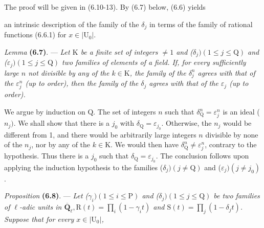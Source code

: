 \documentclass[10pt,leqno]{article}
\begin{document}
\par

\noindent The proof will be given in (6.10-13). By (6.7) below, (6.6) yields\par

\clearpage

\label{physical-26}\setcounter{page}{297}

\noindent an intrinsic description of the family of the \(\delta _{j}\) in terms of the family of rational functions (6.6.1) for \(x\in |\mathrm{U}_{0}|\).\par

\noindent \emph{Lemma} \textbf{(6.7)}. — {\itshape Let \(\mathrm{K}\) be a finite set of integers \(\ne 1\) and (\(\delta _{j}) (1\leq j\leq \mathrm{Q})\) and (\(\varepsilon _{j}) (1\leq j\leq \mathrm{Q})\) two families of elements of a field. If, for every sufficiently large \(n\) not divisible by any of the \(k\in \mathrm{K}\), the family of the \(\delta _{j}^{n}\) agrees with that of the \(\varepsilon _{j}^{n}\) (up to order), then the family of the \(\delta _{j}\) agrees with that of the \(\varepsilon _{j}\) (up to order).}\par

\noindent We argue by induction on \(\mathrm{Q}\). The set of integers \(n\) such that \(\delta _{\mathrm{Q}}^{n}=\varepsilon _{j}^{n}\) is an ideal (\(n_{j})\). We shall show that there is a \(j_{0}\) with \(\delta _{\mathrm{Q}}=\varepsilon _{j_{0}}\). Otherwise, the \(n_{j}\) would be different from 1, and there would be arbitrarily large integers \(n\) divisible by none of the \(n_{j}\), nor by any of the \(k\in \mathrm{K}\). We would then have \(\delta _{\mathrm{Q}}^{n}\ne \varepsilon _{j}^{n}\), contrary to the hypothesis. Thus there is a \(j_{0}\) such that \(\delta _{\mathrm{Q}}=\varepsilon _{j_{0}}\). The conclusion follows upon applying the induction hypothesis to the families (\(\delta _{j}) (j\ne \mathrm{Q})\) and (\(\varepsilon _{j}) (j\ne j_{0})\).\par

\noindent \emph{Proposition} \textbf{(6.8)}. — {\itshape Let (\(\gamma _{i}) (1\leq i\leq \mathrm{P})\) and (\(\delta _{j}) (1\leq j\leq \mathrm{Q})\) be two families of \(\ell \)-adic units in \(\overline{\mathbf{Q}}_{\ell }, \mathrm{R}(t)=\prod _{i}(1- \gamma _{i} t)\) and \(\mathrm{S}(t)=\prod _{j}(1- \delta _{j} t)\). Suppose that for every \(x\in |\mathrm{U}_{0}|\),}\par
\end{document}
